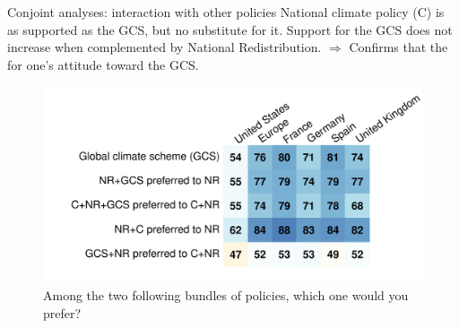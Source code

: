 \documentclass[aspectratio=169,xcolor=dvipsnames, 11pt,mathserif]{beamer}
\begin{document}
\begin{framefont}{\small}
\begin{frame}{Conjoint analyses: interaction with other policies \hyperlink{gcs_support}{}\label{conjoint_ab}} 
    \bbvs \ip National climate policy (C) is as supported as the GCS, but no substitute for it.
	\ip Support for the GCS does not increase when complemented by National Redistribution.
	\ip $\Rightarrow$ Confirms that the  for one's attitude toward the GCS.
    \ee
    \begin{figure} \vspace*{-.5cm}
        \centering 
        \caption{Among the two following bundles of policies, which one would you prefer?}
        \vspace{-.2cm} 
        \includegraphics[height=.65\textheight]{../figures/country_comparison/conjoint_ab_positive.pdf} 
    \end{figure}
\end{frame}


\end{framefont}
\end{document}
